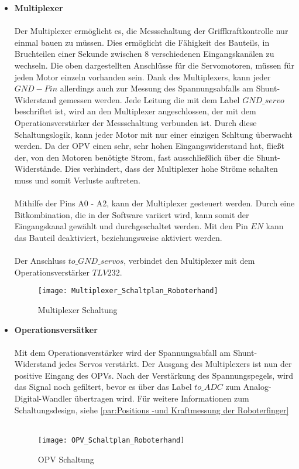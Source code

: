 \documentclass[titlepage,12pt,twoside]{article}
\begin{document}
\begin{itemize}
	\item \textbf{Multiplexer} \\
	\\
	Der Multiplexer ermöglicht es, die Messschaltung der Griffkraftkontrolle nur einmal bauen zu müssen. Dies ermöglicht die Fähigkeit des Bauteils, in Bruchteilen einer Sekunde zwischen 8 verschiedenen Eingangskanälen zu wechseln.
	Die oben dargestellten Anschlüsse für die Servomotoren, müssen für jeden Motor einzeln vorhanden sein. Dank des Multiplexers, kann jeder $GND-Pin$ allerdings auch zur Messung des Spannungsabfalls am Shunt-Widerstand gemessen werden.
	Jede Leitung die mit dem Label $GND\_servo$ beschriftet ist, wird an den Multiplexer angeschlossen, der mit dem Operationsverstärker der Messschaltung verbunden ist. Durch diese Schaltungslogik, kann jeder Motor mit nur einer einzigen
	Schltung überwacht werden. Da der OPV einen sehr, sehr hohen Eingangswiderstand hat, fließt der, von den Motoren benötigte Strom, fast ausschließlich über die Shunt-Widerstände. Dies verhindert, dass der Multiplexer hohe Ströme
	schalten muss und somit Verluste auftreten. \\
	\\
	Mithilfe der Pins A0 - A2, kann der Multiplexer gesteuert werden. Durch eine Bitkombination, die in der Software variiert wird, kann somit der Eingangskanal gewählt und durchgeschaltet werden. Mit den Pin $EN$ kann das Bauteil deaktiviert,
	beziehungsweise aktiviert werden. \\
	\\
	Der Anschluss $to\_GND\_servos$, verbindet den Multiplexer mit dem Operationsverstärker $TLV232$.
	\\
	\begin{figure}[H]
		\begin{center}
			\scalebox{1.0}
			{\texttt{[image: Multiplexer\_Schaltplan\_Roboterhand]}}
			\caption{Multiplexer Schaltung}
			\label{fig:Multiplexer_Schaltplan_Roboterhand}		
			\end{center}
	\end{figure}
	\hfill \break

	\item \textbf{Operationsversätker} \\
	\\
	Mit dem Operationsverstärker wird der Spannungsabfall am Shunt-Widerstand jedes Servos verstärkt. Der Ausgang des Multiplexers ist nun der positive Eingang des OPVs. Nach der Verstärkung des Spannungspegels, wird
	das Signal noch gefiltert, bevor es über das Label $to\_ADC$ zum Analog-Digital-Wandler übertragen wird. Für weitere Informationen zum Schaltungsdesign, siehe \autoref{par:Positions -und Kraftmessung der Roboterfinger} \\
	\\
	\begin{figure}[H]
		\begin{center}
			\scalebox{1.0}
			{\texttt{[image: OPV\_Schaltplan\_Roboterhand]}}
			\caption{OPV Schaltung}
			\label{fig:OPV_Schaltplan_Roboterhand}		
		\end{center}
	\end{figure}
	\hfill \break


\end{itemize}
\end{document}
